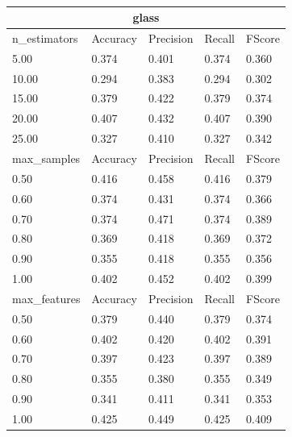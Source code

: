 \documentclass[12pt,a4paper]{article}
\begin{document}
\\
\begin{tabular}{ |p{3cm}||p{2cm}|p{2cm}|p{2cm}|p{2cm}| }
\hline
\multicolumn{5}{|c|}{glass}\\
\hline
n\_estimators & Accuracy & Precision & Recall & FScore \\
\hline
5.00 & 0.374 & 0.401 & 0.374 & 0.360\\
10.00 & 0.294 & 0.383 & 0.294 & 0.302\\
15.00 & 0.379 & 0.422 & 0.379 & 0.374\\
20.00 & 0.407 & 0.432 & 0.407 & 0.390\\
25.00 & 0.327 & 0.410 & 0.327 & 0.342\\
\hline
max\_samples & Accuracy & Precision & Recall & FScore \\
\hline
0.50 & 0.416 & 0.458 & 0.416 & 0.379\\
0.60 & 0.374 & 0.431 & 0.374 & 0.366\\
0.70 & 0.374 & 0.471 & 0.374 & 0.389\\
0.80 & 0.369 & 0.418 & 0.369 & 0.372\\
0.90 & 0.355 & 0.418 & 0.355 & 0.356\\
1.00 & 0.402 & 0.452 & 0.402 & 0.399\\
\hline
max\_features & Accuracy & Precision & Recall & FScore \\
\hline
0.50 & 0.379 & 0.440 & 0.379 & 0.374\\
0.60 & 0.402 & 0.420 & 0.402 & 0.391\\
0.70 & 0.397 & 0.423 & 0.397 & 0.389\\
0.80 & 0.355 & 0.380 & 0.355 & 0.349\\
0.90 & 0.341 & 0.411 & 0.341 & 0.353\\
1.00 & 0.425 & 0.449 & 0.425 & 0.409\\
\hline
\end{tabular}
\\
\end{document}
